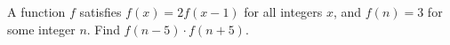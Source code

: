 A function $f$ satisfies $f(x)=2f(x-1)$ for all integers $x$, and $f(n)=3$ for some integer $n$. Find $f(n-5)\cdot f(n+5)$.
